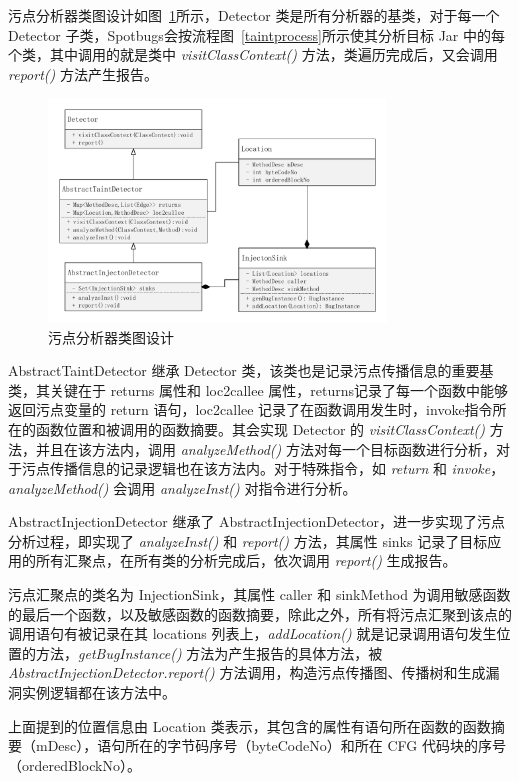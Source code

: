 污点分析器类图设计如图~\ref{taintDetectorClass}所示，Detector 类是所有分析器的基类，对于每一个 Detector 子类，Spotbugs会按流程图~\ref{taintprocess}所示使其分析目标 Jar 中的每个类，其中调用的就是类中 \textit{visitClassContext()} 方法，类遍历完成后，又会调用 \textit{report()} 方法产生报告。
\begin{figure}[!htb]
	\centering
	\includegraphics[width=0.8\textwidth]{FIGs/chapter3/taintDetectorClass.pdf}
	\caption{污点分析器类图设计}\label{taintDetectorClass}
\end{figure}

AbstractTaintDetector 继承 Detector 类，该类也是记录污点传播信息的重要基类，其关键在于 returns 属性和 loc2callee 属性，returns记录了每一个函数中能够返回污点变量的 return 语句，loc2callee 记录了在函数调用发生时，invoke指令所在的函数位置和被调用的函数摘要。其会实现 Detector 的 \textit{visitClassContext()} 方法，并且在该方法内，调用 \textit{analyzeMethod()} 方法对每一个目标函数进行分析，对于污点传播信息的记录逻辑也在该方法内。对于特殊指令，如 \textit{return} 和 \textit{invoke}，\textit{analyzeMethod()} 会调用  \textit{analyzeInst()} 对指令进行分析。

AbstractInjectionDetector 继承了 AbstractInjectionDetector，进一步实现了污点分析过程，即实现了 \textit{analyzeInst()} 和 \textit{report()} 方法，其属性 sinks 记录了目标应用的所有汇聚点，在所有类的分析完成后，依次调用 \textit{report()} 生成报告。

污点汇聚点的类名为 InjectionSink，其属性 caller 和 sinkMethod 为调用敏感函数的最后一个函数，以及敏感函数的函数摘要，除此之外，所有将污点汇聚到该点的调用语句有被记录在其 locations 列表上，\textit{addLocation()} 就是记录调用语句发生位置的方法，\textit{getBugInstance()} 方法为产生报告的具体方法，被 \textit{AbstractInjectionDetector.report()} 方法调用，构造污点传播图、传播树和生成漏洞实例逻辑都在该方法中。

上面提到的位置信息由 Location 类表示，其包含的属性有语句所在函数的函数摘要（mDesc），语句所在的字节码序号（byteCodeNo）和所在 CFG 代码块的序号（orderedBlockNo）。



